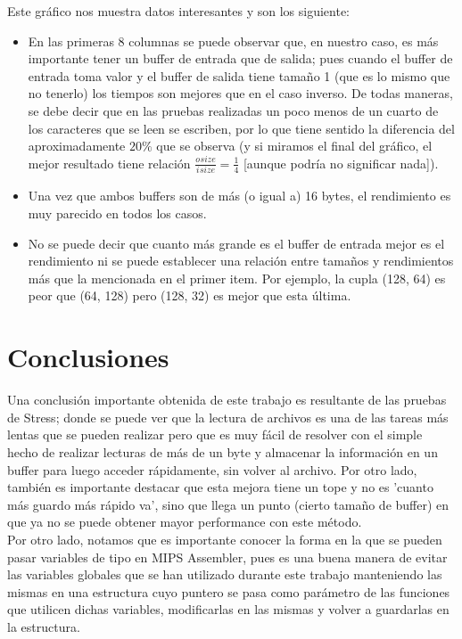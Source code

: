 \documentclass[a4paper, 10pt]{article}
\newcommand\tab[1][0.5cm]{\hspace*{#1}}
\begin{document}
    			\tab Este gráfico nos muestra datos interesantes y son los siguiente:
    			\begin{itemize}
    				\item En las primeras 8 columnas se puede observar que, en nuestro caso, es más importante tener un buffer de entrada
    				que de salida; pues cuando el buffer de entrada toma valor y el buffer de salida tiene tamaño 1 (que es lo mismo que
    				no tenerlo) los tiempos son mejores que en el caso inverso. De todas maneras, se debe decir que en las pruebas 
    				realizadas un poco menos de un cuarto de los caracteres que se leen se escriben, por lo que tiene sentido la
    				diferencia del aproximadamente $20\%$ que se observa (y si miramos el final del gráfico, el mejor resultado tiene
    				relación $\frac{o_{}size}{i_{}size} = \frac{1}{4}$ [aunque podría no significar nada]).
    				\item Una vez que ambos buffers son de más (o igual a) 16 bytes, el rendimiento es muy parecido en todos los casos.
    				\item No se puede decir que cuanto más grande es el buffer de entrada mejor es el rendimiento ni se puede establecer
    				una relación entre tamaños y rendimientos más que la mencionada en el primer item. Por ejemplo, la cupla (128, 64) es
    				peor que (64, 128) pero (128, 32) es mejor que esta última.
    			\end{itemize}

	\section{Conclusiones}
		Una conclusión importante obtenida de este trabajo es resultante de las pruebas de Stress; donde se puede ver que la lectura
		de archivos es una de las tareas más lentas que se pueden realizar pero que es muy fácil de resolver con el simple hecho de 
		realizar lecturas de más de un byte y almacenar la información en un buffer para luego acceder rápidamente, sin volver al 
		archivo. Por otro lado, también es importante destacar que esta mejora tiene un tope y no es 'cuanto más guardo más rápido
		va', sino que llega un punto (cierto tamaño de buffer) en que ya no se puede obtener mayor performance con este método. \\
		\tab Por otro lado, notamos que es importante conocer la forma en la que se pueden pasar variables de tipo \tab{struct} en
		MIPS Assembler, pues es una buena manera de evitar las variables globales que se han utilizado durante este trabajo manteniendo
		las mismas en una estructura cuyo puntero se pasa como parámetro de las funciones que utilicen dichas variables, modificarlas
		en las mismas y volver a guardarlas en la estructura.
\end{document}
